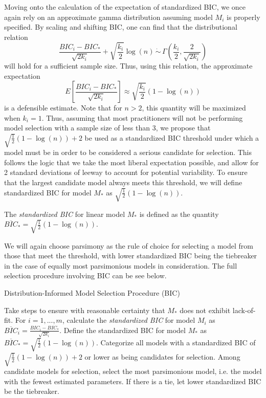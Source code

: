 		Moving onto the calculation of the expectation of standardized BIC, we once again rely on an approximate gamma distribution assuming model $M_i$ is properly specified.
		By scaling and shifting BIC, one can find that the distributional relation
		\begin{equation}
			\frac{BIC_i - BIC_*}{\sqrt{2k_i}} + \sqrt{\frac{k_i}{2}} \log(n) \, \dot\sim \, \Gamma \left( \frac{k_i}{2}, \frac{2}{\sqrt{2k_i}} \right)
		\end{equation}
		will hold for a sufficient sample size. Thus, using this relation, the approximate expectation
		\begin{equation}
			E \left[ \frac{BIC_i - BIC_*}{\sqrt{2k_i}} \right] \approx \sqrt{\frac{k_i}{2}} (1-\log(n))
		\end{equation}
		is a defensible estimate. Note that for $n > 2$, this quantity will be maximized when $k_i = 1$. Thus, assuming that most practitioners will not be performing model
		selection with a sample size of less than 3, we propose that $\sqrt{\frac{1}{2}} (1-\log(n)) + 2$ be used as a standardized BIC threshold under which a model must be
		in order to be considered a serious candidate for selection. This follows the logic that we take the most liberal expectation possible, and allow for 2 standard
		deviations of leeway to account for potential variability. To ensure that the largest candidate model always meets this threshold, we will define standardized BIC
		for model $M_*$ as $\sqrt{\frac{1}{2}} (1-\log(n))$.
		\begin{definition}
			The \textit{standardized BIC} for linear model $M_*$ is defined as the quantity $\overline{BIC}_* = \sqrt{\frac{1}{2}} (1-\log(n))$.
		\end{definition}
		
		We will again choose parsimony as the rule of choice for selecting a model from those that meet the threshold, with lower standardized BIC being the tiebreaker in the
		case of equally most parsimonious models in consideration. The full selection procedure involving BIC can be see below.
		\begin{algorithm}[H]
			\caption{Distribution-Informed Model Selection Procedure (BIC)}
			\begin{algorithmic}[1]
			  \State Take steps to ensure with reasonable certainty that $M_*$ does not exhibit lack-of-fit.
			  \State For $i = 1,...,m$, calculate the \textit{standardized BIC} for model $M_i$ as 
			  $\overline{BIC}_i = \frac{BIC_i - BIC_*}{\sqrt{2k_i}}$. Define the standardized BIC for model
			  $M_*$ as $\overline{BIC}_* = \sqrt{\frac{1}{2}} (1-\log(n))$.
			  \State Categorize all models with a standardized BIC of $\sqrt{\frac{1}{2}} (1-\log(n)) + 2$ or lower as
			  being candidates for selection.
			  \State Among candidate models for selection, select the most parsimonious model, i.e. the model
			  with the fewest estimated parameters. If there is a tie, let lower standardized BIC be the
			  tiebreaker.
			\end{algorithmic}
		\end{algorithm}

